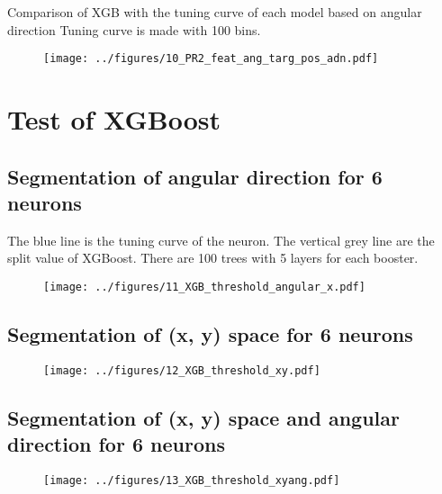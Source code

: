 \documentclass[10pt,a4paper,twocolumn]{article}
\begin{document}
Comparison of XGB with the tuning curve of each model based on angular direction 
Tuning curve is made with 100 bins.

\begin{figure}[H]
	\begin{center}
		\texttt{[image: ../figures/10\_PR2\_feat\_ang\_targ\_pos\_adn.pdf]} 
	\end{center}
\end{figure}


\onecolumn

\section{Test of XGBoost}

\subsection{Segmentation of angular direction for 6 neurons}

The blue line is the tuning curve of the neuron.
The vertical grey line are the split value of XGBoost. There are 100 trees with 5 layers for each booster.

\begin{figure}[H]
	\begin{center}
		\texttt{[image: ../figures/11\_XGB\_threshold\_angular\_x.pdf]}
	\end{center}
\end{figure}

\subsection{Segmentation of (x, y) space for 6 neurons}

\begin{figure}[H]
	\begin{center}
		\texttt{[image: ../figures/12\_XGB\_threshold\_xy.pdf]}
	\end{center}
\end{figure}


\subsection{Segmentation of (x, y) space and angular direction for 6 neurons}

\begin{figure}[H]
	\begin{center}
		\texttt{[image: ../figures/13\_XGB\_threshold\_xyang.pdf]}
	\end{center}
\end{figure}
\end{document}
